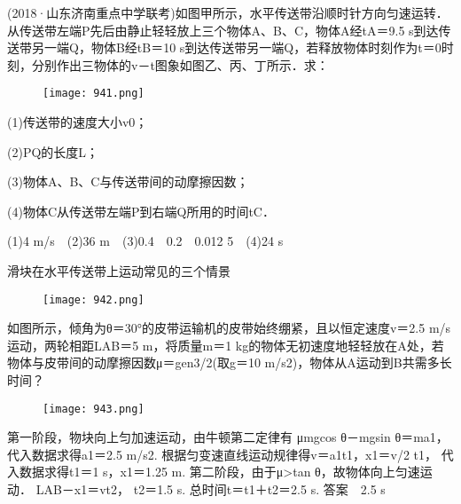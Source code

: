 \documentclass[cn,11pt]{elegantbook}
\begin{document}
\begin{example}
   (2018·山东济南重点中学联考)如图甲所示，水平传送带沿顺时针方向匀速运转．从传送带左端P先后由静止轻轻放上三个物体A、B、C，物体A经tA＝9.5 s到达传送带另一端Q，物体B经tB＝10 s到达传送带另一端Q，若释放物体时刻作为t＝0时刻，分别作出三物体的v－t图象如图乙、丙、丁所示．求：

   \begin{figure}[htbp]
      \centering
      \texttt{[image: 941.png]}
   \end{figure}

   (1)传送带的速度大小v0；
   
   (2)PQ的长度L；
   
   (3)物体A、B、C与传送带间的动摩擦因数；
   
   (4)物体C从传送带左端P到右端Q所用的时间tC．   
   \begin{solution}
      (1)4 m/s　(2)36 m　(3)0.4　0.2　0.012 5　(4)24 s      

   \end{solution}
\end{example}

\begin{note}
   滑块在水平传送带上运动常见的三个情景
   \begin{figure}[htbp]
      \centering
      \texttt{[image: 942.png]}
   \end{figure}
\end{note}

\begin{example}
   如图所示，倾角为θ＝30°的皮带运输机的皮带始终绷紧，且以恒定速度v＝2.5 m/s运动，两轮相距LAB＝5 m，将质量m＝1 kg的物体无初速度地轻轻放在A处，若物体与皮带间的动摩擦因数μ＝gen3/2(取g＝10 m/s2)，物体从A运动到B共需多长时间？

   \begin{figure}[htbp]
      \centering
      \texttt{[image: 943.png]}
   \end{figure}

   \begin{solution}
      第一阶段，物块向上匀加速运动，由牛顿第二定律有
      μmgcos θ－mgsin θ＝ma1，
      代入数据求得a1＝2.5 m/s2.
      根据匀变速直线运动规律得v＝a1t1，x1＝v/2 t1，
      代入数据求得t1＝1 s，x1＝1.25 m.
      第二阶段，由于μ>tan θ，故物体向上匀速运动．
      LAB－x1＝vt2，
      t2＝1.5 s.
      总时间t＝t1＋t2＝2.5 s.
      答案　2.5 s
   \end{solution}
\end{example}
\end{document}
